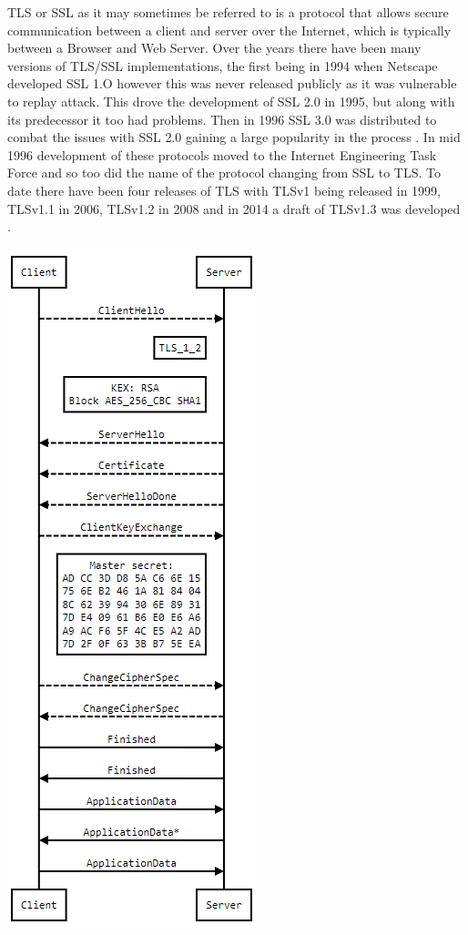 \documentclass[a4wide,leqno,12pt]{report}
\begin{document}
TLS or SSL as it may sometimes be referred to is a protocol that allows secure communication between a client and server over the Internet, which is typically between a Browser and Web Server. Over the years there have been many versions of TLS/SSL implementations, the first being in 1994 when Netscape developed SSL 1.O however this was never released publicly as it was vulnerable to replay attack\cite{turner2014transport}. This drove the development of SSL 2.0 in 1995, but along with its predecessor it too had problems. Then in 1996 SSL 3.0 was distributed to combat the issues with SSL 2.0 gaining a large popularity in the process \cite{turner2014transport}. In mid 1996 development of these protocols moved to the Internet Engineering Task Force and so too did the name of the protocol changing from SSL to TLS. To date there have been four releases of TLS with TLSv1 being released in 1999, TLSv1.1 in 2006, TLSv1.2 in 2008\cite{turner2014transport} and in 2014 a draft of TLSv1.3 was developed
 \cite{dierks2014transport}.\\
 \begin{center}
\includegraphics[scale=.5]{images/tls_demo.png}
\end{center}
\end{document}
